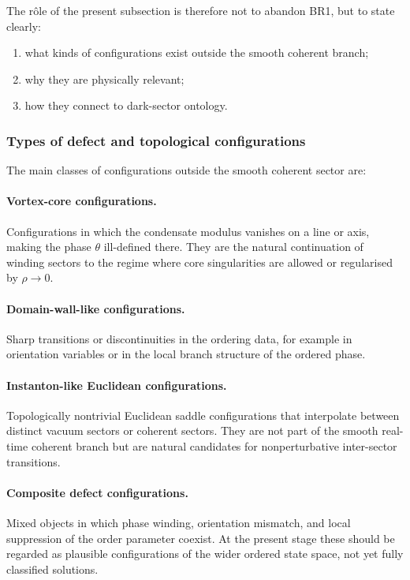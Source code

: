 \documentclass[11pt,a4paper]{article}
\numberwithin{equation}{section}
\begin{document}
The r\^ole of the present subsection is therefore not to abandon BR1,
but to state clearly:
\begin{enumerate}[label=(\roman*)]
  \item what kinds of configurations exist outside the smooth coherent
    branch;
  \item why they are physically relevant;
  \item how they connect to dark-sector ontology.
\end{enumerate}

\subsubsection*{Types of defect and topological configurations}

The main classes of configurations outside the smooth coherent sector are:

\paragraph{Vortex-core configurations.}
Configurations in which the condensate modulus vanishes on a line or
axis, making the phase $\theta$ ill-defined there.
They are the natural continuation of winding sectors to the regime
where core singularities are allowed or regularised by $\rho\to 0$.

\paragraph{Domain-wall-like configurations.}
Sharp transitions or discontinuities in the ordering data, for example
in orientation variables or in the local branch structure of the
ordered phase.

\paragraph{Instanton-like Euclidean configurations.}
Topologically nontrivial Euclidean saddle configurations that
interpolate between distinct vacuum sectors or coherent sectors.
They are not part of the smooth real-time coherent branch but are
natural candidates for nonperturbative inter-sector transitions.

\paragraph{Composite defect configurations.}
Mixed objects in which phase winding, orientation mismatch, and local
suppression of the order parameter coexist.
At the present stage these should be regarded as plausible
configurations of the wider ordered state space, not yet fully
classified solutions.
\end{document}
